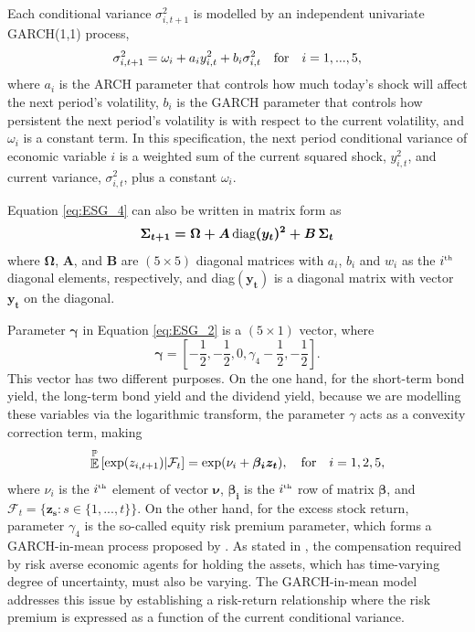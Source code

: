 \documentclass{sfuthesis}
\DeclareMathOperator{\E}{\mathbb{E}}
\numberwithin{equation}{chapter}
\begin{document}
		\justify
		Each conditional variance $\sigma^2_{i,t+1}$ is modelled by an independent univariate GARCH(1,1) process,
		\begin{equation}
		\label{eq:ESG_4}
		\sigma^2_{i,t+1} = \omega_{i} + a_{i} y_{i,t}^2 +b_{i} \sigma^2_{i,t} \quad \textnormal{for}\quad i = 1,...,5,
		\end{equation}
		where $a_i$ is the ARCH parameter that controls how much today's shock will affect the next period's volatility, $b_i$ is the GARCH parameter that controls how persistent the next period's volatility is with respect to the current volatility, and $\omega_i$ is a constant term. In this specification, the next period conditional variance of economic variable $i$ is a weighted sum of the current squared shock, $y_{i,t}^2$, and current variance, $\sigma^2_{i,t}$, plus a constant $\omega_{i}$. 


		\justify
		Equation \eqref{eq:ESG_4} can also be written in matrix form as
		\begin{equation}
		\label{eq:ESG_5}
		\boldsymbol{\Sigma_{t+1} = \Omega + A\, \textnormal{diag}(y_t)^2 + B\, \Sigma_{t}}
		\end{equation}
		where $\boldsymbol{\Omega}$, $\boldsymbol{A}$, and $\boldsymbol{B}$ are $(5 \times 5)$ diagonal matrices with $a_i$, $b_i$ and $w_i$ as the $i^{\text{\tiny{th}}}$ diagonal elements, respectively, and diag$(\boldsymbol{y_t})$ is a diagonal matrix with vector $\boldsymbol{y_t}$ on the diagonal.
	
	
		\justify
		Parameter $\boldsymbol{\gamma}$ in Equation \eqref{eq:ESG_2} is a $(5 \times 1)$ vector, where
		\begin{equation}
		\label{eq:ESG_6}
		\boldsymbol{\gamma} = \left[-\frac{1}{2}, -\frac{1}{2}, 0, \gamma_4-\frac{1}{2}, -\frac{1}{2} \right].
		\end{equation}
		This vector has two different purposes. On the one hand, for the short-term bond yield, the long-term bond yield and the dividend yield, because we are modelling these variables via the logarithmic transform, the parameter $\gamma$ acts as a convexity correction term, making
		\begin{equation}
		\label{eq:ESG_7}
		\E^\mathbb{P}\left[\exp(z_{i,t+1})\middle|\mathcal{F}_t\right]=\exp(\nu_i+\boldsymbol{\beta_i}\boldsymbol{z_{t}}), \quad \textnormal{for} \quad i = 1,2,5,
		\end{equation}
		where $\nu_i$ is the $i^{\text{\tiny{th}}}$ element of vector $\boldsymbol{\nu}$, $\boldsymbol{\beta_i}$ is the $i^{\text{\tiny{th}}}$ row of matrix $\boldsymbol{\beta}$, and $\mathcal{F}_t = \{\boldsymbol{z_{s}}: s\in \{1, ..., t\}\}$. On the other hand, for the excess stock return, parameter $\gamma_4$ is the so-called equity risk premium parameter, which forms a GARCH-in-mean process proposed by \citet{Engle1987}. As stated in \citet{Engle1987}, the compensation required by risk averse economic agents for holding the assets, which has time-varying degree of uncertainty, must also be varying. The GARCH-in-mean model addresses this issue by establishing a risk-return relationship where the risk premium is expressed as a function of the current conditional variance.
	
\end{document}
